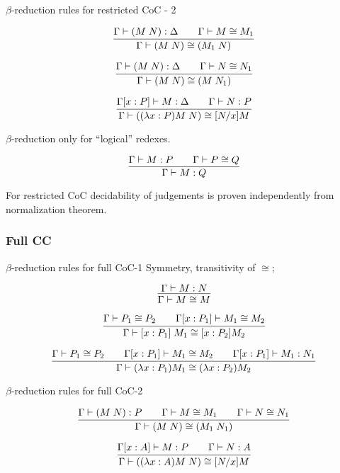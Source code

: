 \documentclass{beamer}
\begin{document}
\begin{frame}{$\beta$-reduction rules for restricted CoC - 2}
 
 
$$\infer{\Gamma \vdash (M \; N) \cong (M_1 \; N)} {\Gamma \vdash (M \; N) : \Delta & \quad \Gamma \vdash M \cong M_1} $$

$$\infer{\Gamma \vdash (M \; N) \cong (M \; N_1)}{\Gamma \vdash (M \; N) : \Delta & \quad \Gamma \vdash N \cong N_1}$$

$$\infer{\Gamma \vdash ((\lambda x : P) M \; N) \cong [N/x] M}{\Gamma[x:P]\vdash M:\Delta & \quad \Gamma \vdash N: P} $$

 $\beta$-reduction only for ``logical'' redexes.

 
$$\infer{\Gamma \vdash M : Q}{\Gamma \vdash M:P & \quad \Gamma \vdash P \cong Q}$$


For restricted CoC decidability of judgements is proven independently from normalization theorem. 

\end{frame}


\subsubsection{Full CC}

\begin{frame}{$\beta$-reduction rules for full CoC-1}
Symmetry, transitivity of $\cong$;


$$\infer{\Gamma \vdash M \cong M }{\Gamma \vdash M: N}$$  


$$\infer{\Gamma \vdash [x:P_1] \; M_1 \cong [x : P_2] M_2} {\Gamma \vdash P_1 \cong P_2 & \quad \Gamma [x: P_1] \vdash M_1 \cong M_2 } $$
 
\pause
$$\infer{\Gamma \vdash (\lambda x:P_1) M_1 \cong (\lambda x : P_2) M_2} {\Gamma \vdash P_1 \cong P_2 & \quad \Gamma [x: P_1] \vdash M_1 \cong M_2 & \quad \Gamma [x: P_1] \vdash M_1 : N_1} $$


\end{frame}

\begin{frame}{$\beta$-reduction rules for full CoC-2}

$$\infer{\Gamma \vdash (M \; N) \cong (M_1 \; N_1)} {\Gamma \vdash (M \; N) : P & \quad \Gamma \vdash M \cong M_1 & \quad \Gamma \vdash N \cong N_1} $$

$$\infer{\Gamma \vdash ((\lambda x : A) M \; N) \cong [N/x] M}{\Gamma[x:A] \vdash M:P & \quad \Gamma \vdash N: A}$$

\end{frame}
\end{document}
